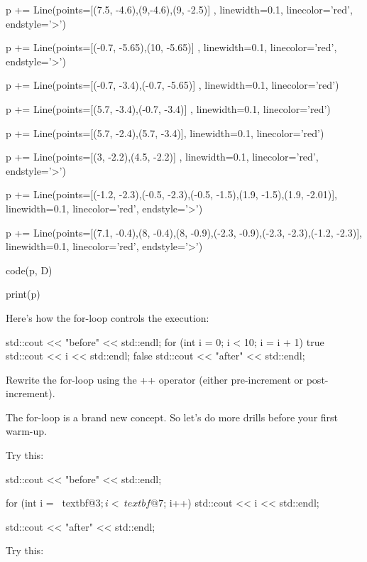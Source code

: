 \begin{python}
p += Line(points=[(7.5, -4.6),(9,-4.6),(9, -2.5)] , linewidth=0.1, linecolor='red', endstyle='>')

p += Line(points=[(-0.7, -5.65),(10, -5.65)] , linewidth=0.1, linecolor='red', endstyle='>')

p += Line(points=[(-0.7, -3.4),(-0.7, -5.65)] , linewidth=0.1, linecolor='red')

p += Line(points=[(5.7, -3.4),(-0.7, -3.4)] , linewidth=0.1, linecolor='red')

p += Line(points=[(5.7, -2.4),(5.7, -3.4)], linewidth=0.1, linecolor='red')

p += Line(points=[(3, -2.2),(4.5, -2.2)] , linewidth=0.1, linecolor='red', endstyle='>')

p += Line(points=[(-1.2, -2.3),(-0.5, -2.3),(-0.5, -1.5),(1.9, -1.5),(1.9, -2.01)], linewidth=0.1, linecolor='red', endstyle='>')

p += Line(points=[(7.1, -0.4),(8, -0.4),(8, -0.9),(-2.3, -0.9),(-2.3, -2.3),(-1.2, -2.3)], linewidth=0.1, linecolor='red', endstyle='>')

code(p, D)

print(p)
\end{python}
Here's how the for-loop controls the execution:
\begin{console}
std::cout << "before" << std::endl;
for (int i = 0; i < 10; i = i + 1)
true
std::cout << i << std::endl;
false
std::cout << "after" << std::endl;
\end{console}

\begin{ex}
 Rewrite the for-loop using the ++ operator (either
pre-increment or post-increment).
\end{ex}

\newpage{}

The for-loop is a brand new concept. So let's do more
drills before your first warm-up.


Try this:
\begin{console}[commandchars=\~\@\$]
std::cout << "before" << std::endl;

for (int i = ~textbf@3$; i < ~textbf@7$; i++)
    std::cout << i << std::endl;

std::cout << "after" << std::endl;
\end{console}


Try this:


